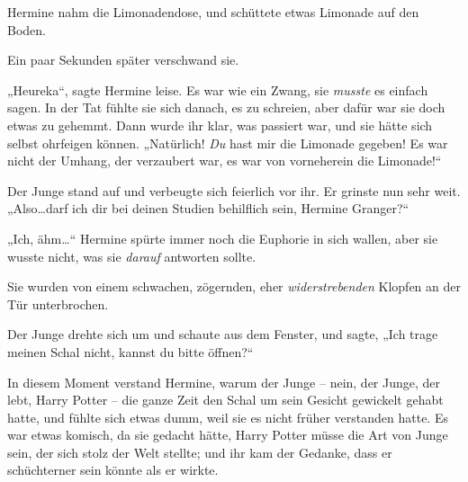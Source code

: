 Hermine nahm die Limonadendose, und schüttete etwas Limonade auf den Boden.

Ein paar Sekunden später verschwand sie.

„Heureka“, sagte Hermine leise. Es war wie ein Zwang, sie \emph{musste} es einfach sagen. In der Tat fühlte sie sich danach, es zu schreien, aber dafür war sie doch etwas zu gehemmt. Dann wurde ihr klar, was passiert war, und sie hätte sich selbst ohrfeigen können. „Natürlich! \emph{Du} hast mir die Limonade gegeben! Es war nicht der Umhang, der verzaubert war, es war von vorneherein die Limonade!“

Der Junge stand auf und verbeugte sich feierlich vor ihr. Er grinste nun sehr weit. „Also…darf ich dir bei deinen Studien behilflich sein, Hermine Granger?“

„Ich, ähm…“ Hermine spürte immer noch die Euphorie in sich wallen, aber sie wusste nicht, was sie \emph{darauf} antworten sollte.

Sie wurden von einem schwachen, zögernden, eher \emph{widerstrebenden} Klopfen an der Tür unterbrochen.

Der Junge drehte sich um und schaute aus dem Fenster, und sagte, „Ich trage meinen Schal nicht, kannst du bitte öffnen?“

In diesem Moment verstand Hermine, warum der Junge – nein, der Junge, der lebt, Harry Potter – die ganze Zeit den Schal um sein Gesicht gewickelt gehabt hatte, und fühlte sich etwas dumm, weil sie es nicht früher verstanden hatte. Es war etwas komisch, da sie gedacht hätte, Harry Potter müsse die Art von Junge sein, der sich stolz der Welt stellte; und ihr kam der Gedanke, dass er schüchterner sein könnte als er wirkte.

